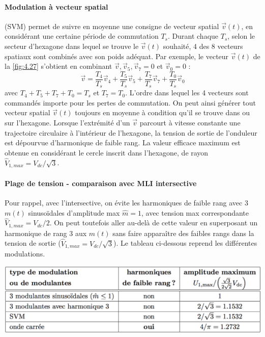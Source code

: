 		\paragraph{Modulation à vecteur spatial} \quad (SVM) permet de suivre en moyenne une consigne de vecteur spatial $\vec{v}(t)$, en considérant une certaine période de commutation $T_s$. Durant chaque $T_s$, selon le secteur d'hexagone dans lequel se trouve le $\vec{v}(t)$ souhaité, 4 des 8 vecteurs spatiaux sont combinés avec son poids adéquat. Par exemple, le vecteur $\vec{v}(t)$ de la \autoref{fig:4.27} s'obtient en combinant $\vec{v}, \vec{v}_5, \vec{v}_7 = 0$ et $\vec{v}_0 = 0$ : 
		\begin{equation}
			\vec{v} = \frac{T_4}{T_s}\vec{v}_4 + \frac{T_5}{T_s}\vec{v}_5 +\frac{T_7}{T_s}\vec{v}_7+ \frac{T_0}{T_s}\vec{v}_0
		\end{equation}
		avec $T_4+T_5+T_7+T_0=T_s$ et $T_7=T_0$. L'ordre dans lequel les 4 vecteurs sont commandés importe pour les pertes de commutation. On peut ainsi générer tout vecteur spatial $\vec{v}(t)$ toujours en moyenne à condition qu'il se trouve dans ou sur l'hexagone. Lorsque l'extrémité d'un $\vec{v}$ parcourt à vitesse constante une trajectoire circulaire à l'intérieur de l'hexagone, la tension de sortie de l'onduleur est dépourvue d'harmonique de faible rang. La valeur efficace maximum est obtenue en considérant le cercle inscrit dans l'hexagone, de rayon $\hat{V}_{1,max} = V_{dc}/\sqrt{3}$. 
		
		\paragraph{Plage de tension - comparaison avec MLI intersective} \quad Pour rappel, avec l'intersective, on évite les harmoniques de faible rang avec 3 $m(t)$ sinusoïdales d'amplitude max $\hat{m}=1$, avec tension max correspondante $\hat{V}_{1,max} = V_{dc}/2$. On peut toutefois aller au-delà de cette valeur en superposant un harmonique de rang 3 aux $m(t)$ sans faire apparaître des faibles rangs dans la tension de sortie ($\hat{V}_{1,max}=V_{dc}/\sqrt{3}$). Le tableau ci-dessous reprend les différentes modulations.
		\begin{center}
		\includegraphics[scale=0.4]{ch4/30}
		\end{center}
		
